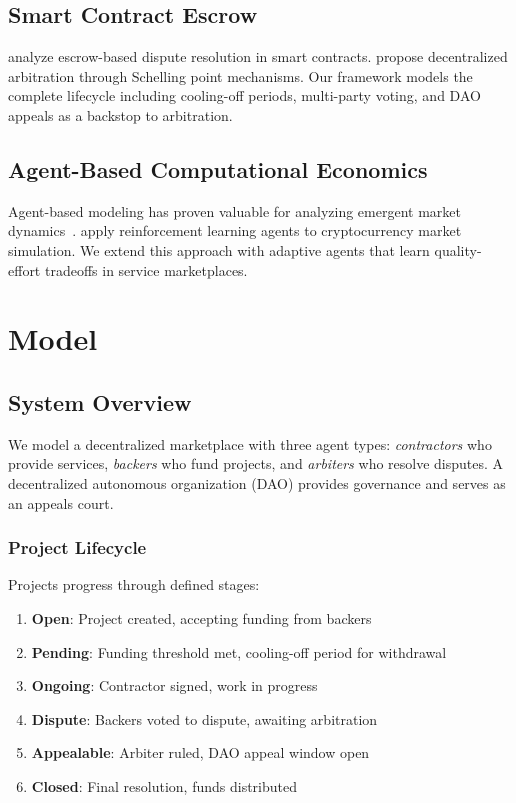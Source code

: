 \documentclass[11pt,a4paper]{article}
\begin{document}
\subsection{Smart Contract Escrow}

\citet{asgaonkar2019solving} analyze escrow-based dispute resolution in smart contracts. \citet{kleros2019} propose decentralized arbitration through Schelling point mechanisms. Our framework models the complete lifecycle including cooling-off periods, multi-party voting, and DAO appeals as a backstop to arbitration.

\subsection{Agent-Based Computational Economics}

Agent-based modeling has proven valuable for analyzing emergent market dynamics~\citep{tesfatsion2006handbook, farmer2009economy}. \citet{zheng2020ai} apply reinforcement learning agents to cryptocurrency market simulation. We extend this approach with adaptive agents that learn quality-effort tradeoffs in service marketplaces.

\section{Model}

\subsection{System Overview}

We model a decentralized marketplace with three agent types: \textit{contractors} who provide services, \textit{backers} who fund projects, and \textit{arbiters} who resolve disputes. A decentralized autonomous organization (DAO) provides governance and serves as an appeals court.

\subsubsection{Project Lifecycle}

Projects progress through defined stages:

\begin{enumerate}
    \item \textbf{Open}: Project created, accepting funding from backers
    \item \textbf{Pending}: Funding threshold met, cooling-off period for withdrawal
    \item \textbf{Ongoing}: Contractor signed, work in progress
    \item \textbf{Dispute}: Backers voted to dispute, awaiting arbitration
    \item \textbf{Appealable}: Arbiter ruled, DAO appeal window open
    \item \textbf{Closed}: Final resolution, funds distributed
\end{enumerate}
\end{document}
